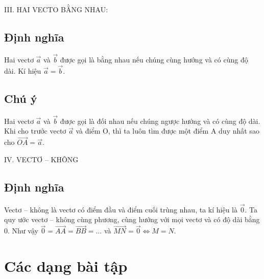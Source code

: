 
III. HAI VECTO BẰNG NHAU:
\subsection{Định nghĩa}
\begin{dn}
    Hai vectơ $\vec{a}$ và $\vec{b}$ được gọi là bằng nhau nếu chúng cùng hướng và có cùng độ dài.
    Kí hiệu $\vec{a} = \vec{b}$.
\end{dn}

\subsection{Chú ý}
\begin{note}
    Hai vectơ $\vec{a}$ và $\vec{b}$ được gọi là đối nhau nếu chúng ngược hướng và có cùng độ dài.
    Khi cho trước vectơ $\vec{a}$ và điểm O, thì ta luôn tìm được một điểm A duy nhất sao cho $\vec{OA} = \vec{a}$.
\end{note}

IV. VECTƠ – KHÔNG
\subsection{Định nghĩa}
\begin{dn}
    Vectơ – không là vectơ có điểm đầu và điểm cuối trùng nhau, ta kí hiệu là $\vec{0}$.
    Ta quy ước vectơ – không cùng phương, cùng hướng với mọi vectơ và có độ dài bằng 0.
    Như vậy $\vec{0} = \vec{AA} = \vec{BB} = \dots$ và $\vec{MN} = \vec{0} \Leftrightarrow M = N$.
\end{dn}

\section{Các dạng bài tập}

